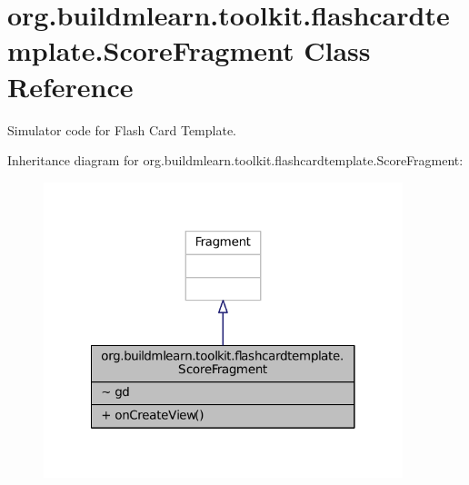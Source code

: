 \hypertarget{classorg_1_1buildmlearn_1_1toolkit_1_1flashcardtemplate_1_1ScoreFragment}{\section{org.\-buildmlearn.\-toolkit.\-flashcardtemplate.\-Score\-Fragment Class Reference}
\label{classorg_1_1buildmlearn_1_1toolkit_1_1flashcardtemplate_1_1ScoreFragment}
}


Simulator code for Flash Card Template.  




Inheritance diagram for org.\-buildmlearn.\-toolkit.\-flashcardtemplate.\-Score\-Fragment\-:
\nopagebreak
\begin{figure}[H]
\begin{center}
\leavevmode
\includegraphics[width=296pt]{dc/d62/classorg_1_1buildmlearn_1_1toolkit_1_1flashcardtemplate_1_1ScoreFragment__inherit__graph}
\end{center}
\end{figure}


